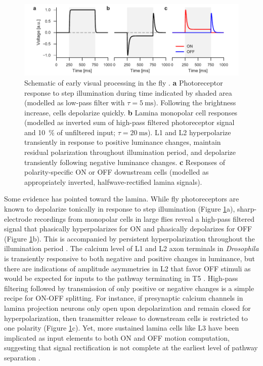 \begin{figure}
    \centering
    \includegraphics[width=1.02\textwidth]{graphics/figure_lamina}
    \caption[Peripheral processing of ON and OFF]
    {Schematic of early visual processing in the fly \citep[see ][]{Laughlin:1978aa,Eichner:2011ic}. \textbf{a} Photoreceptor response to step illumination during time indicated by shaded area (modelled as low-pass filter with $\tau = \SI{5}{\milli\second}$). Following the brightness increase, cells depolarize quickly. \textbf{b} Lamina monopolar cell responses (modelled as inverted sum of high-pass filtered photoreceptor signal and \SI{10}{\percent} of unfiltered input; $\tau = \SI{20}{\milli\second}$). L1 and L2 hyperpolarize transiently in response to positive luminance changes, maintain residual polarization throughout illumination period, and depolarize transiently following negative luminance changes. \textbf{c} Responses of polarity-specific ON or OFF downstream cells (modelled as appropriately inverted, halfwave-rectified lamina signals).}
    \label{fig:lamina}
\end{figure}

Some evidence has pointed toward the lamina. While fly photoreceptors are known to depolarize tonically in response to step illumination (Figure \ref{fig:lamina}a), sharp-electrode recordings from monopolar cells in large flies reveal a high-pass filtered signal that phasically hyperpolarizes for ON and phasically depolarizes for OFF (Figure \ref{fig:lamina}b). This is accompanied by persistent hyperpolarization throughout the illumination period \citep{Laughlin:1978aa}. The calcium level of L1 and L2 axon terminals in \textit{Drosophila} is transiently responsive to both negative and positive changes in luminance, but there are indications of amplitude asymmetries in L2 that favor OFF stimuli as would be expected for inputs to the pathway terminating in T5 \citep{Reiff:2010eo,Clark:2011gw}. High-pass filtering followed by transmission of only positive or negative changes is a simple recipe for ON-OFF splitting. For instance, if presynaptic calcium channels in lamina projection neurons only open upon depolarization and remain closed for hyperpolarization, then transmitter release to downstream cells is restricted to one polarity  (Figure \ref{fig:lamina}c). Yet, more sustained lamina cells like L3 have been implicated as input elements to both ON and OFF motion computation, suggesting that signal rectification is not complete at the earliest level of pathway separation \citep{Silies:2013jp,Takemura:2017aa}.

